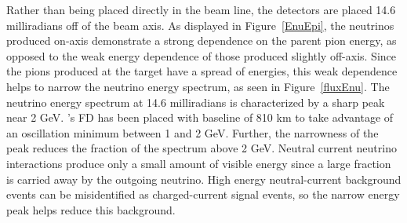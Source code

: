 Rather than being placed directly in the \numi beam line, the \nova detectors are placed 14.6 milliradians off of the beam axis.  As displayed in Figure~\ref{EnuEpi}, the neutrinos produced on-axis demonstrate a strong dependence on the parent pion energy, as opposed to the weak energy dependence of those produced slightly off-axis.  Since the pions produced at the target have a spread of energies, this weak dependence helps to narrow the neutrino energy spectrum, as seen in Figure~\ref{fluxEnu}.  The neutrino energy spectrum at 14.6 milliradians is characterized by a sharp peak near 2 GeV.  \nova's FD has been placed with baseline of 810 km to take advantage of an oscillation minimum between 1 and 2 GeV.  Further, the narrowness of the peak reduces the fraction of the spectrum above 2 GeV.  Neutral current neutrino interactions produce only a small amount of visible energy since a large fraction is carried away by the outgoing neutrino.  High energy neutral-current background events can be misidentified as charged-current signal events, so the narrow energy peak helps reduce this background.  
